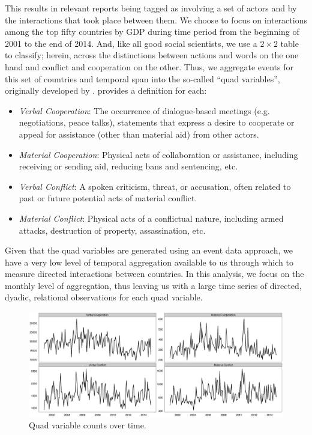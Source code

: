 \documentclass[3p,times,twocolumn,authoryear,12pt]{elsarticle}
\begin{document}
This results in relevant reports being tagged as involving a set of actors and by the interactions that took place between them. We choose to focus on interactions among the top fifty countries by GDP during time period from the beginning of 2001 to the end of 2014. And, like all good social scientists, we use a $2 \times 2$ table to classify; herein, across the distinctions between actions and words on the one hand and conflict and cooperation on the other.  Thus, we aggregate events for this set of countries and temporal span into the so-called ``quad variables'', originally developed by \citet{duval:thompson:1980}. \citet{yonamine:2011} provides a definition for each:

\begin{itemize}
	\item \emph{Verbal Cooperation}: The occurrence of dialogue-based meetings (e.g. negotiations, peace talks), statements that express a desire to cooperate or appeal for assistance (other than material aid) from other actors.
	\item \emph{Material Cooperation}: Physical acts of collaboration or assistance, including receiving or sending aid, reducing bans and sentencing, etc.
	\item \emph{Verbal Conflict}: A spoken criticism, threat, or accusation, often related to past or future potential acts of material conflict.
	\item \emph{Material Conflict}: Physical acts of a conflictual nature, including armed attacks, destruction of property, assassination, etc.
\end{itemize}

Given that the quad variables are generated using an event data approach, we have a very low level of temporal aggregation available to us through which to measure directed interactions between countries. In this analysis, we focus on the monthly level of aggregation, thus leaving us with a large time series of directed, dyadic, relational observations for each quad variable. 

\begin{figure}[ht]
	\centering
	\includegraphics[width=1\textwidth]{dvMonthly}
	\caption{Quad variable counts over time.}
	\label{fig:dvAgg}
\end{figure}
\end{document}
